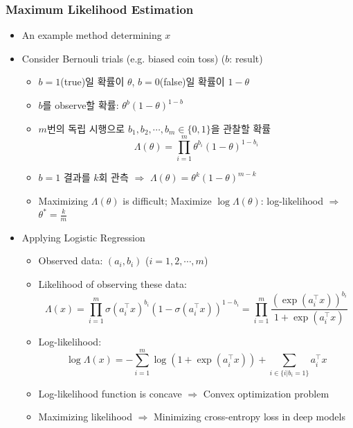 \subsubsection*{Maximum Likelihood Estimation}
\begin{itemize}
    \item An example method determining $x$
    \item Consider Bernouli trials (e.g. biased coin toss) ($b$: result)
    \begin{itemize}
        \item $b=1$(true)일 확률이 $\theta$, $b=0$(false)일 확률이 $1-\theta$
        \item $b$를 observe할 확률: $\theta^b(1-\theta)^{1-b}$
        \item $m$번의 독립 시행으로 $b_1,b_2,\cdots,b_m\in\{0,1\}$을 관찰할 확률
        \begin{equation}
            \Lambda(\theta)=\prod_{i=1}^m\theta^{b_i}(1-\theta)^{1-b_i}
        \end{equation}
        \item $b=1$ 결과를 $k$회 관측 $\Rightarrow$ $\Lambda(\theta)=\theta^k(1-\theta)^{m-k}$
        \item Maximizing $\Lambda(\theta)$ is difficult; Maximize $\log\Lambda(\theta)$: log-likelihood $\Rightarrow$ $\theta^\ast=\frac{k}{m}$
    \end{itemize}
    \item Applying Logistic Regression
    \begin{itemize}
        \item Observed data: $(a_i,b_i)$ ($i=1,2,\cdots,m$)
        \item Likelihood of observing these data:
        \begin{equation}
            \Lambda(x)=\prod_{i=1}^m\sigma(a_i^{\top}x)^{b_i}\left(1-\sigma(a_i^{\top}x)\right)^{1-b_i}=\prod_{i=1}^m\frac{\left(\exp(a_i^{\top}x)\right)^{b_i}}{1+\exp(a_i^{\top}x)}
        \end{equation}
        \item Log-likelihood:
        \begin{equation}
            \log\Lambda(x)=-\sum_{i=1}^m\log\left(1+\exp(a_i^{\top}x)\right)+\sum_{i\in\{i|b_i=1\}}a_i^{\top}x
        \end{equation}
        \item Log-likelihood function is concave $\Rightarrow$ Convex optimization problem
        \item Maximizing likelihood $\Rightarrow$ Minimizing cross-entropy loss in deep models
    \end{itemize}
\end{itemize}

